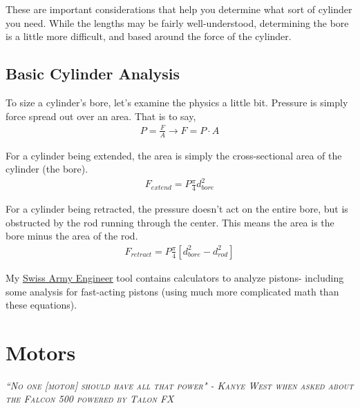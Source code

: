 These are important considerations that help you determine what sort of cylinder you need. While the lengths may be fairly well-understood, determining the bore is a little more difficult, and based around the force of the cylinder.

\section{Basic Cylinder Analysis}

To size a cylinder's bore, let's examine the physics a little bit. Pressure is simply force spread out over an area. That is to say,
\begin{align}
	P = \frac{F}{A} \rightarrow F = P \cdot A
\end{align}

For a cylinder being extended, the area is simply the cross-sectional area of the cylinder (the bore).
\begin{align}
	F_{extend} = P \frac{\pi}{4} d_{bore}^2
\end{align}

For a cylinder being retracted, the pressure doesn't act on the entire bore, but is obstructed by the rod running through the center. This means the area is the bore minus the area of the rod.
\begin{align}
	F_{retract} = P \frac{\pi}{4} [ d_{bore}^2 - d_{rod}^2 ]
\end{align}

My \href{http://thaddeus-maximus.github.io/swissarmyengineer/}{\color{red}\underline{Swiss Army Engineer}} tool contains calculators to analyze pistons- including some analysis for fast-acting pistons (using much more complicated math than these equations).


\chapter{Motors}

 {\slshape \scshape ``No one [motor] should have all that power" - Kanye West when asked about the Falcon 500 powered by Talon FX}
 \\ %
 
